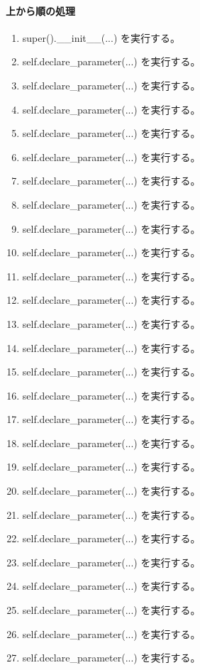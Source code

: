 \documentclass[a4paper,11pt]{article}
\begin{document}
            \paragraph{上から順の処理}
            \begin{enumerate}[leftmargin=1.8em]
            \item super().\_\_init\_\_(...) を実行する。
\item self.declare\_parameter(...) を実行する。
\item self.declare\_parameter(...) を実行する。
\item self.declare\_parameter(...) を実行する。
\item self.declare\_parameter(...) を実行する。
\item self.declare\_parameter(...) を実行する。
\item self.declare\_parameter(...) を実行する。
\item self.declare\_parameter(...) を実行する。
\item self.declare\_parameter(...) を実行する。
\item self.declare\_parameter(...) を実行する。
\item self.declare\_parameter(...) を実行する。
\item self.declare\_parameter(...) を実行する。
\item self.declare\_parameter(...) を実行する。
\item self.declare\_parameter(...) を実行する。
\item self.declare\_parameter(...) を実行する。
\item self.declare\_parameter(...) を実行する。
\item self.declare\_parameter(...) を実行する。
\item self.declare\_parameter(...) を実行する。
\item self.declare\_parameter(...) を実行する。
\item self.declare\_parameter(...) を実行する。
\item self.declare\_parameter(...) を実行する。
\item self.declare\_parameter(...) を実行する。
\item self.declare\_parameter(...) を実行する。
\item self.declare\_parameter(...) を実行する。
\item self.declare\_parameter(...) を実行する。
\item self.declare\_parameter(...) を実行する。
\item self.declare\_parameter(...) を実行する。

\end{enumerate}
\end{document}

